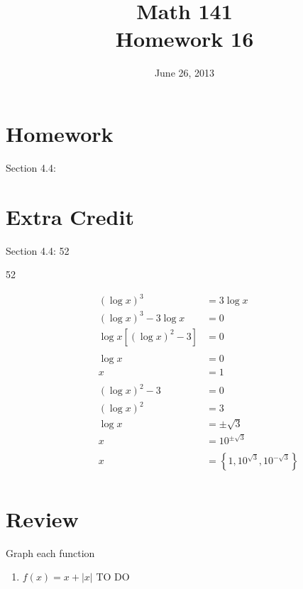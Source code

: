 \documentclass{exam}
\date{June 26, 2013}
\author{}
\title{Math 141 \\ Homework 16}
\begin{document}
  \maketitle

  \section{Homework}

  Section 4.4: 

  \ifprintanswers
    \pagebreak
  \fi

  \section{Extra Credit}
  Section 4.4: 52

  \ifprintanswers
    \begin{description}
      \item[52] 
        \begin{align*}
          (\log x)^3                &= 3 \log x \\
          (\log x)^3 - 3 \log x     &= 0 \\
          \log x \left[(\log x)^2 - 3 \right] &= 0 \\
          \\
          \log x &= 0 \\
          x      &= 1 \\
          \\
          (\log x)^2 - 3 &= 0 \\
          (\log x)^2     &= 3 \\
          \log x         &= \pm \sqrt{3} \\
          x              &= 10^{\pm \sqrt{3}} \\
          \\
          x &= \boxed{\left\{ 1, 10^{\sqrt{3}}, 10^{ - \sqrt{3}} \right\} } \\
        \end{align*}
    \end{description}
  \fi

  \ifprintanswers
    \pagebreak
  \fi

  \section{Review}

  Graph each function
  \begin{enumerate}

    \item $f(x) = x + |x|$ 
      \ifprintanswers
        TO DO
      \fi

  \end{enumerate}
\end{document}
